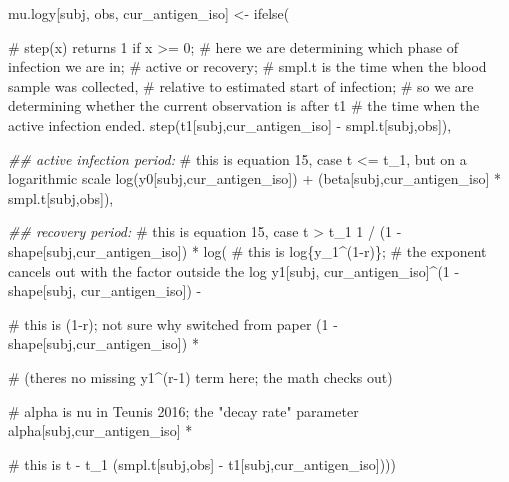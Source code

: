 \documentclass[
]{article}
\newenvironment{Shaded}{\begin{snugshade}}{\end{snugshade}}
\newcommand{\CommentTok}[1]{\textcolor[rgb]{0.37,0.37,0.37}{#1}}
\newcommand{\DecValTok}[1]{\textcolor[rgb]{0.68,0.00,0.00}{#1}}
\newcommand{\DocumentationTok}[1]{\textcolor[rgb]{0.37,0.37,0.37}{\textit{#1}}}
\newcommand{\FunctionTok}[1]{\textcolor[rgb]{0.28,0.35,0.67}{#1}}
\newcommand{\NormalTok}[1]{\textcolor[rgb]{0.00,0.23,0.31}{#1}}
\newcommand{\OtherTok}[1]{\textcolor[rgb]{0.00,0.23,0.31}{#1}}
\newcommand{\SpecialCharTok}[1]{\textcolor[rgb]{0.37,0.37,0.37}{#1}}
\begin{document}
\begin{Shaded}
\begin{Highlighting}[numbers=left,,firstnumber=18,]
\NormalTok{     mu.logy[subj, obs, cur\_antigen\_iso] }\OtherTok{\textless{}{-}} \FunctionTok{ifelse}\NormalTok{(}
        
        \CommentTok{\# \textasciigrave{}step(x)\textasciigrave{} returns 1 if x \textgreater{}= 0;}
        \CommentTok{\# here we are determining which phase of infection we are in; }
        \CommentTok{\# active or recovery;}
        \CommentTok{\# \textasciigrave{}smpl.t\textasciigrave{} is the time when the blood sample was collected, }
        \CommentTok{\# relative to estimated start of infection;}
        \CommentTok{\# so we are determining whether the current observation is after \textasciigrave{}t1\textasciigrave{} }
        \CommentTok{\# the time when the active infection ended.}
        \FunctionTok{step}\NormalTok{(t1[subj,cur\_antigen\_iso] }\SpecialCharTok{{-}}\NormalTok{ smpl.t[subj,obs]), }
        
        \DocumentationTok{\#\# active infection period:}
        \CommentTok{\# this is equation 15, case t \textless{}= t\_1, but on a logarithmic scale}
        \FunctionTok{log}\NormalTok{(y0[subj,cur\_antigen\_iso]) }\SpecialCharTok{+}\NormalTok{ (beta[subj,cur\_antigen\_iso] }\SpecialCharTok{*}\NormalTok{ smpl.t[subj,obs]),}
        
        \DocumentationTok{\#\# recovery period:}
        \CommentTok{\# this is equation 15, case t \textgreater{} t\_1}
        \DecValTok{1} \SpecialCharTok{/}\NormalTok{ (}\DecValTok{1} \SpecialCharTok{{-}}\NormalTok{ shape[subj,cur\_antigen\_iso]) }\SpecialCharTok{*}
           \FunctionTok{log}\NormalTok{(}
              \CommentTok{\# this is \textasciigrave{}log\{y\_1\^{}(1{-}r)\}\textasciigrave{}; }
              \CommentTok{\# the exponent cancels out with the factor outside the log}
\NormalTok{              y1[subj, cur\_antigen\_iso]}\SpecialCharTok{\^{}}\NormalTok{(}\DecValTok{1} \SpecialCharTok{{-}}\NormalTok{ shape[subj, cur\_antigen\_iso]) }\SpecialCharTok{{-}} 
                 
               \CommentTok{\# this is (1{-}r); not sure why switched from paper  }
\NormalTok{              (}\DecValTok{1} \SpecialCharTok{{-}}\NormalTok{ shape[subj,cur\_antigen\_iso]) }\SpecialCharTok{*}
                
                  \CommentTok{\# (there\textquotesingle{}s no missing y1\^{}(r{-}1) term here; the math checks out)}
                 
                 \CommentTok{\# alpha is \textasciigrave{}nu\textasciigrave{} in Teunis 2016; the "decay rate" parameter}
\NormalTok{                alpha[subj,cur\_antigen\_iso] }\SpecialCharTok{*}
                 
                 \CommentTok{\# this is \textasciigrave{}t {-} t\_1\textasciigrave{}}
\NormalTok{                 (smpl.t[subj,obs] }\SpecialCharTok{{-}}\NormalTok{ t1[subj,cur\_antigen\_iso])))}
\end{Highlighting}
\end{Shaded}
\end{document}
